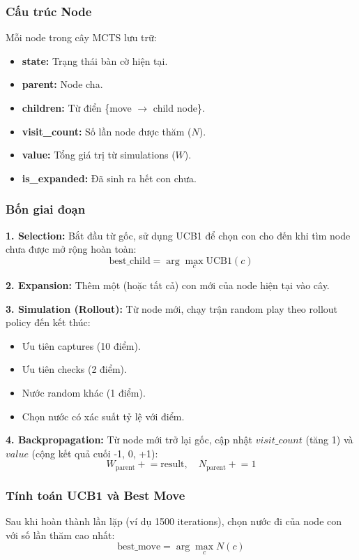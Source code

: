 \subsubsection{Cấu trúc Node}
Mỗi node trong cây MCTS lưu trữ:
\begin{itemize}
    \item \textbf{state:} Trạng thái bàn cờ hiện tại.
    \item \textbf{parent:} Node cha.
    \item \textbf{children:} Từ điển \{move $\to$ child node\}.
    \item \textbf{visit\_count:} Số lần node được thăm ($N$).
    \item \textbf{value:} Tổng giá trị từ simulations ($W$).
    \item \textbf{is\_expanded:} Đã sinh ra hết con chưa.
\end{itemize}

\subsubsection{Bốn giai đoạn}

\textbf{1. Selection:} Bắt đầu từ gốc, sử dụng UCB1 để chọn con cho đến khi tìm node chưa được mở rộng hoàn toàn:
$$\text{best\_child} = \arg\max_c \text{UCB1}(c)$$

\textbf{2. Expansion:} Thêm một (hoặc tất cả) con mới của node hiện tại vào cây.

\textbf{3. Simulation (Rollout):} Từ node mới, chạy trận random play theo rollout policy đến kết thúc:
\begin{itemize}
    \item Ưu tiên captures (10 điểm).
    \item Ưu tiên checks (2 điểm).
    \item Nước random khác (1 điểm).
    \item Chọn nước có xác suất tỷ lệ với điểm.
\end{itemize}

\textbf{4. Backpropagation:} Từ node mới trở lại gốc, cập nhật $visit\_count$ (tăng 1) và $value$ (cộng kết quả cuối -1, 0, +1):
$$W_{\text{parent}} \mathrel{+}= \text{result}, \quad N_{\text{parent}} \mathrel{+}= 1$$

\subsubsection{Tính toán UCB1 và Best Move}
Sau khi hoàn thành lần lặp (ví dụ 1500 iterations), chọn nước đi của node con với số lần thăm cao nhất:
$$\text{best\_move} = \arg\max_c N(c)$$

